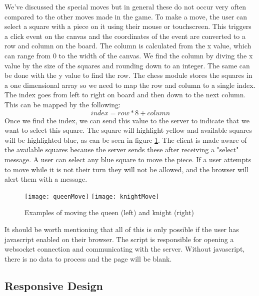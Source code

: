 We've discussed the special moves but in general these do not occur very often compared to the other moves made in the game. To make a move, the user can select a square with a piece on it using their mouse or touchscreen. This triggers a click event on the canvas and the coordinates of the event are converted to a row and column on the board. The column is calculated from the x value, which can range from 0 to the width of the canvas. We find the column by diving the x value by the size of the squares and rounding down to an integer. The same can be done with the y value to find the row. The chess module stores the squares in a one dimensional array so we need to map the row and column to a single index. The index goes from left to right on board and then down to the next column. This can be mapped by the following:$$index = row * 8 + column$$Once we find the index, we can send this value to the server to indicate that we want to select this square. The square will highlight yellow and available squares will be highlighted blue, as can be seen in figure \ref{exampleMove}. The client is made aware of the available squares because the server sends these after receiving a "select" message. A user can select any blue square to move the piece. If a user attempts to move while it is not their turn they will not be allowed, and the browser will alert them with a message.

\begin{figure}
    \begin{center}
        \texttt{[image: queenMove]}
        \texttt{[image: knightMove]}
        \caption{Examples of moving the queen (left) and knight (right)}
        \label{exampleMove}
    \end{center}
\end{figure}

It should be worth mentioning that all of this is only possible if the user has javascript enabled on their browser. The script is responsible for opening a websocket connection and communicating with the server. Without javascript, there is no data to process and the page will be blank.

\subsection{Responsive Design}


